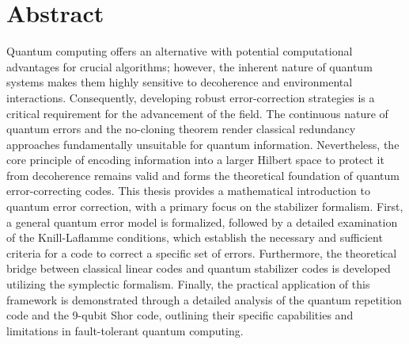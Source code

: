 {\chapter*{Abstract}\label{sec:Abstract}}
 

\thispagestyle{plain}

{}

Quantum computing offers an alternative with potential computational advantages for crucial algorithms; however, the inherent nature of quantum systems makes them highly sensitive to decoherence and environmental interactions. Consequently, developing robust error-correction strategies is a critical requirement for the advancement of the field. The continuous nature of quantum errors and the no-cloning theorem render classical redundancy approaches fundamentally unsuitable for quantum information. Nevertheless, the core principle of encoding information into a larger Hilbert space to protect it from decoherence remains valid and forms the theoretical foundation of quantum error-correcting codes. This thesis provides a mathematical introduction to quantum error correction, with a primary focus on the stabilizer formalism. First, a general quantum error model is formalized, followed by a detailed examination of the Knill-Laflamme conditions, which establish the necessary and sufficient criteria for a code to correct a specific set of errors. Furthermore, the theoretical bridge between classical linear codes and quantum stabilizer codes is developed utilizing the symplectic formalism. Finally, the practical application of this framework is demonstrated through a detailed analysis of the quantum repetition code and the 9-qubit Shor code, outlining their specific capabilities and limitations in fault-tolerant quantum computing.

\cleardoublepage
